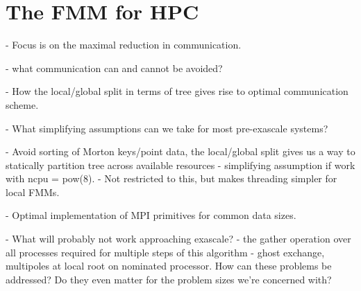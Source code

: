 \chapter{The FMM for HPC}\label{chpt:hpc}
\thispagestyle{chaptertitle} %

- Focus is on the maximal reduction in communication.

- what communication can and cannot be avoided?

- How the local/global split in terms of tree gives rise to optimal communication scheme.

- What simplifying assumptions can we take for most pre-exascale systems?

- Avoid sorting of Morton keys/point data, the local/global split gives us a way to statically partition tree across available resources - simplifying assumption if work with ncpu = pow(8).
- Not restricted to this, but makes threading simpler for local FMMs.

- Optimal implementation of MPI primitives for common data sizes.

- What will probably not work approaching exascale?
- the gather operation over all processes required for multiple steps of this algorithm - ghost exchange, multipoles at local root on nominated processor. How can these problems be addressed? Do they even matter for the problem sizes we're concerned with?

